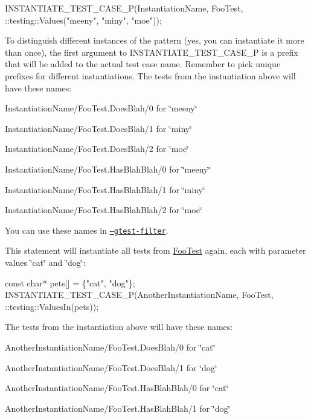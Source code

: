 \begin{DoxyCode}
INSTANTIATE\_TEST\_CASE\_P(InstantiationName,
                        FooTest,
                        ::testing::Values("meeny", "miny", "moe"));
\end{DoxyCode}


To distinguish different instances of the pattern (yes, you can instantiate it more than once), the first argument to {\ttfamily I\+N\+S\+T\+A\+N\+T\+I\+A\+T\+E\+\_\+\+T\+E\+S\+T\+\_\+\+C\+A\+S\+E\+\_\+P} is a prefix that will be added to the actual test case name. Remember to pick unique prefixes for different instantiations. The tests from the instantiation above will have these names\+:


\begin{DoxyItemize}
\item {\ttfamily Instantiation\+Name/\+Foo\+Test.\+Does\+Blah/0} for {\ttfamily \char`\"{}meeny\char`\"{}}
\item {\ttfamily Instantiation\+Name/\+Foo\+Test.\+Does\+Blah/1} for {\ttfamily \char`\"{}miny\char`\"{}}
\item {\ttfamily Instantiation\+Name/\+Foo\+Test.\+Does\+Blah/2} for {\ttfamily \char`\"{}moe\char`\"{}}
\item {\ttfamily Instantiation\+Name/\+Foo\+Test.\+Has\+Blah\+Blah/0} for {\ttfamily \char`\"{}meeny\char`\"{}}
\item {\ttfamily Instantiation\+Name/\+Foo\+Test.\+Has\+Blah\+Blah/1} for {\ttfamily \char`\"{}miny\char`\"{}}
\item {\ttfamily Instantiation\+Name/\+Foo\+Test.\+Has\+Blah\+Blah/2} for {\ttfamily \char`\"{}moe\char`\"{}}
\end{DoxyItemize}

You can use these names in \href{#running-a-subset-of-the-tests}{\tt --gtest-\/filter}.

This statement will instantiate all tests from {\ttfamily \hyperlink{class_foo_test}{Foo\+Test}} again, each with parameter values {\ttfamily \char`\"{}cat\char`\"{}} and {\ttfamily \char`\"{}dog\char`\"{}}\+:


\begin{DoxyCode}
const char* pets[] = \{"cat", "dog"\};
INSTANTIATE\_TEST\_CASE\_P(AnotherInstantiationName, FooTest,
                        ::testing::ValuesIn(pets));
\end{DoxyCode}


The tests from the instantiation above will have these names\+:


\begin{DoxyItemize}
\item {\ttfamily Another\+Instantiation\+Name/\+Foo\+Test.\+Does\+Blah/0} for {\ttfamily \char`\"{}cat\char`\"{}}
\item {\ttfamily Another\+Instantiation\+Name/\+Foo\+Test.\+Does\+Blah/1} for {\ttfamily \char`\"{}dog\char`\"{}}
\item {\ttfamily Another\+Instantiation\+Name/\+Foo\+Test.\+Has\+Blah\+Blah/0} for {\ttfamily \char`\"{}cat\char`\"{}}
\item {\ttfamily Another\+Instantiation\+Name/\+Foo\+Test.\+Has\+Blah\+Blah/1} for {\ttfamily \char`\"{}dog\char`\"{}}
\end{DoxyItemize}

